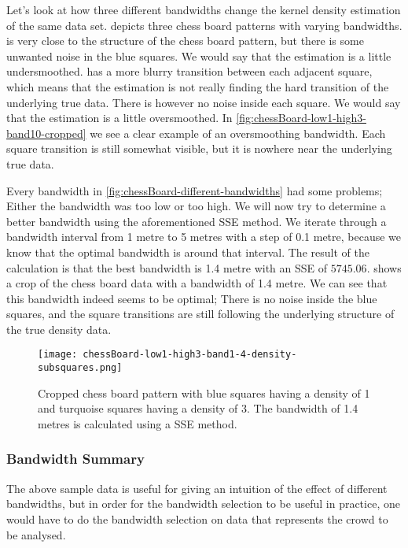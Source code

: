 Let's look at how three different bandwidths change the kernel density estimation of the same data set.  depicts three chess board patterns with varying bandwidths.  is very close to the structure of the chess board pattern, but there is some unwanted noise in the blue squares. We would say that the estimation is a little undersmoothed.  has a more blurry transition between each adjacent square, which means that the estimation is not really finding the hard transition of the underlying true data. There is however no noise inside each square. We would say that the estimation is a little oversmoothed. In \cref{fig:chessBoard-low1-high3-band10-cropped} we see a clear example of an oversmoothing bandwidth. Each square transition is still somewhat visible, but it is nowhere near the underlying true data.

Every bandwidth in \cref{fig:chessBoard-different-bandwidths} had some problems; Either the bandwidth was too low or too high. We will now try to determine a better bandwidth using the aforementioned SSE method. We iterate through a bandwidth interval from 1 metre to 5 metres with a step of 0.1 metre, because we know that the optimal bandwidth is around that interval. The result of the calculation is that the best bandwidth is 1.4 metre with an SSE of $5745.06$.  shows a crop of the chess board data with a bandwidth of 1.4 metre. We can see that this bandwidth indeed seems to be optimal; There is no noise inside the blue squares, and the square transitions are still following the underlying structure of the true density data.

\begin{figure}[htbp]
\centering
\texttt{[image: chessBoard-low1-high3-band1-4-density-subsquares.png]}
\caption[Analysed chess board pattern with bandwidth 1.4]{Cropped chess board pattern with blue squares having a density of 1 and turquoise squares having a density of 3. The bandwidth of 1.4 metres is calculated using a SSE method.}
\label{fig:chessBoard-low1-high3-band1.4-cropped}
\end{figure}

\subsubsection{Bandwidth Summary}

The above sample data is useful for giving an intuition of the effect of different bandwidths, but in order for the bandwidth selection to be useful in practice, one would have to do the bandwidth selection on data that represents the crowd to be analysed.